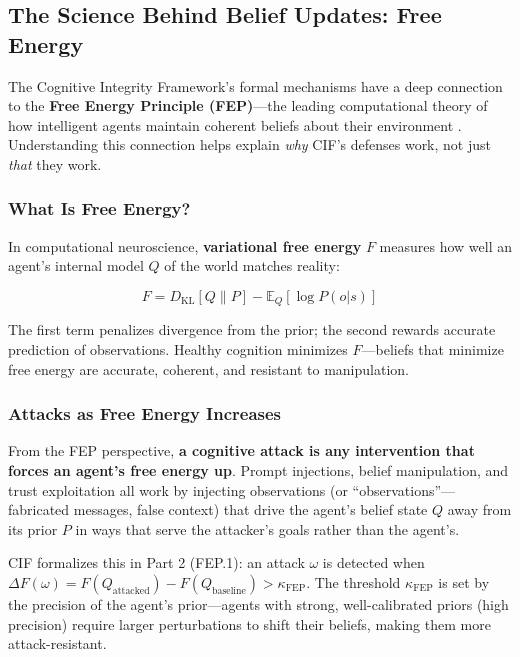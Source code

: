 \documentclass[
]{article}
\begin{document}
\subsection{The Science Behind Belief Updates: Free
Energy}\label{sec:fep-connection}

The Cognitive Integrity Framework's formal mechanisms have a deep
connection to the \textbf{Free Energy Principle (FEP)}---the leading
computational theory of how intelligent agents maintain coherent beliefs
about their environment \cite{friston2010free}. Understanding this
connection helps explain \emph{why} CIF's defenses work, not just
\emph{that} they work.

\subsubsection{What Is Free Energy?}\label{what-is-free-energy}

In computational neuroscience, \textbf{variational free energy} \(F\)
measures how well an agent's internal model \(Q\) of the world matches
reality:

\[F = D_\text{KL}[Q \| P] - \mathbb{E}_Q[\log P(o | s)]\]

The first term penalizes divergence from the prior; the second rewards
accurate prediction of observations. Healthy cognition minimizes
\(F\)---beliefs that minimize free energy are accurate, coherent, and
resistant to manipulation.

\subsubsection{Attacks as Free Energy
Increases}\label{attacks-as-free-energy-increases}

From the FEP perspective, \textbf{a cognitive attack is any intervention
that forces an agent's free energy up}. Prompt injections, belief
manipulation, and trust exploitation all work by injecting observations
(or ``observations''---fabricated messages, false context) that drive
the agent's belief state \(Q\) away from its prior \(P\) in ways that
serve the attacker's goals rather than the agent's.

CIF formalizes this in Part 2 (FEP.1): an attack \(\omega\) is detected
when
\(\Delta F(\omega) = F(Q_\text{attacked}) - F(Q_\text{baseline}) > \kappa_\text{FEP}\).
The threshold \(\kappa_\text{FEP}\) is set by the precision of the
agent's prior---agents with strong, well-calibrated priors (high
precision) require larger perturbations to shift their beliefs, making
them more attack-resistant.
\end{document}
